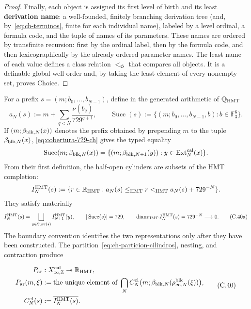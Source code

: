 \begin{proof}
Finally, each object is assigned its first level of birth and its least
\textbf{derivation name}: a well-founded, finitely branching derivation tree
(and, by~\eqref{eq:ch-terminos}, finite for each individual name), labeled by
a level ordinal, a formula code, and the tuple of names of its parameters.
These names are ordered by transfinite recursion: first by the ordinal label,
then by the formula code, and then lexicographically by the already ordered
parameter names. The least name of each value defines a class relation
\(<_{\mathfrak G}\) that compares all objects. It is a definable global
well-order and, by taking the least element of every nonempty set, proves
Choice.
\end{proof}



For a prefix \(s=(m;b_0,\ldots,b_{N-1})\), define in the generated arithmetic
of \(\mathbb Q_{\rm HMT}\)
\[
 a_N(s):=m+\sum_{q<N}\frac{\nu(b_q)}{729^{q+1}},
 \qquad
 \operatorname{Succ}(s):=
 \{(m;b_0,\ldots,b_{N-1},b):b\in\mathbb F_3^6\}.
\]
If \((m;\beta_{{\rm blk},N}(x))\) denotes the prefix obtained by prepending
\(m\) to the tuple \(\beta_{{\rm blk},N}(x)\),
\eqref{eq:cobertura-729-ch} gives the typed equality
\[
 \operatorname{Succ}(m;\beta_{{\rm blk},N}(x))
 =\{(m;\beta_{{\rm blk},N+1}(y)):
       y\in\operatorname{Ext}^{\rm cal}_N(x)\}.
\]
From their first definition, the half-open cylinders are subsets of the HMT
completion:
\[
 I_N^{\rm HMT}(s):=
 \{r\in\mathbb R_{\rm HMT}:
      a_N(s)\le_{\rm HMT}r<_{\rm HMT}a_N(s)+729^{-N}\}.
\]
They satisfy materially
\[
 I_N^{\rm HMT}(s)=
 \bigsqcup_{y\in\operatorname{Succ}(s)}I_{N+1}^{\rm HMT}(y),
 \qquad |\operatorname{Succ}(s)|=729,
 \qquad \operatorname{diam}_{\rm HMT}I_N^{\rm HMT}(s)
      =729^{-N}\longrightarrow0.
\tag{C.40a}\label{eq:ch-particion-cilindros}
\]
The boundary convention identifies the two representations only after they
have been constructed. The partition~\eqref{eq:ch-particion-cilindros},
nesting, and contraction produce

\[
\begin{aligned}
 P_{\rm ar}&:X_{\infty,\mathbb Z}^{\rm cal}
     \twoheadrightarrow\mathbb R_{\rm HMT},\\
 P_{\rm ar}(m,\xi)
   &:=\text{the unique element of }
     \bigcap_N C_N^{\rm cl}
       \bigl(m;\beta_{{\rm blk},N}(\rho^{\rm blk}_{\infty,N}(\xi))\bigr),\\
 C_N^{\rm cl}(s)&:=\overline{I_N^{\rm HMT}(s)}.
\end{aligned}
\tag{C.40}\label{eq:ch-proyeccion-arquimediana}
\]

